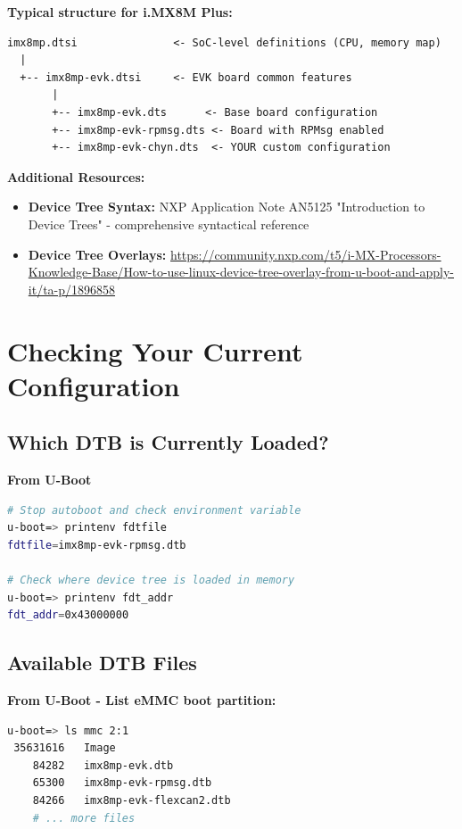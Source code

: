 \documentclass[12pt,a4paper]{report}
\begin{document}
\textbf{Typical structure for i.MX8M Plus:}

\begin{verbatim}
imx8mp.dtsi               <- SoC-level definitions (CPU, memory map)
  |
  +-- imx8mp-evk.dtsi     <- EVK board common features
       |
       +-- imx8mp-evk.dts      <- Base board configuration
       +-- imx8mp-evk-rpmsg.dts <- Board with RPMsg enabled
       +-- imx8mp-evk-chyn.dts  <- YOUR custom configuration
\end{verbatim}
\begin{docref}
\textbf{Additional Resources:}
\begin{itemize}
    \item \textbf{Device Tree Syntax:} NXP Application Note AN5125 "Introduction to Device Trees" - comprehensive syntactical reference
    \item \textbf{Device Tree Overlays:} \url{https://community.nxp.com/t5/i-MX-Processors-Knowledge-Base/How-to-use-linux-device-tree-overlay-from-u-boot-and-apply-it/ta-p/1896858}
\end{itemize}
\end{docref}

\section{Checking Your Current Configuration}

\subsection{Which DTB is Currently Loaded?}

\textbf{From U-Boot}

\begin{lstlisting}[language=bash]
# Stop autoboot and check environment variable
u-boot=> printenv fdtfile
fdtfile=imx8mp-evk-rpmsg.dtb

# Check where device tree is loaded in memory
u-boot=> printenv fdt_addr
fdt_addr=0x43000000
\end{lstlisting}

\subsection{Available DTB Files}

\textbf{From U-Boot - List eMMC boot partition:}

\begin{lstlisting}[language=bash]
u-boot=> ls mmc 2:1
 35631616   Image
    84282   imx8mp-evk.dtb
    65300   imx8mp-evk-rpmsg.dtb
    84266   imx8mp-evk-flexcan2.dtb
    # ... more files
\end{lstlisting}
\end{document}

